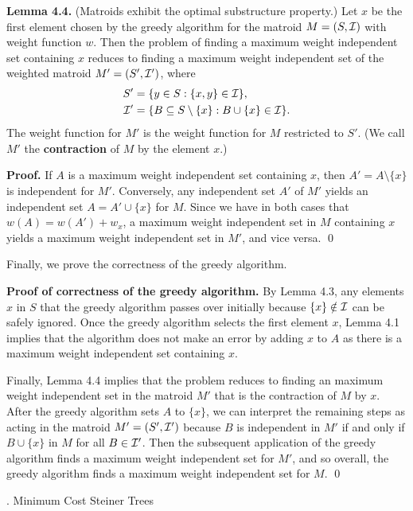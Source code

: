\documentclass{article}
\begin{document}
{\color{violet}
{\bf Lemma 4.4.} (Matroids exhibit the optimal substructure property.)
Let $x$ be the first element chosen by the greedy algorithm for the 
matroid $M = (S, {\cal I})$ with weight function $w$. Then the problem 
of finding a maximum weight independent set containing $x$ reduces to 
finding a maximum weight independent set of the weighted matroid 
$M' = (S', {\cal I}')$, where 
\begin{align*}
    S' &= \{y \in S : \{x, y\} \in {\cal I}\}, \\ 
    {\cal I}' &= \{B \subseteq S \setminus \{x\} : B \cup \{x\} \in {\cal I}\}.
\end{align*} 
The weight function for $M'$ is the weight function for $M$ restricted to $S'$. 
(We call $M'$ the {\bf contraction} of $M$ by the element $x$.)
}

{\color{blue}
{\bf Proof.} If $A$ is a maximum weight independent set containing $x$, 
then $A' = A \setminus \{x\}$ is independent for $M'$. Conversely, 
any independent set $A'$ of $M'$ yields an independent set 
$A = A' \cup \{x\}$ for $M$. Since we have in both cases that 
$w(A) = w(A') + w_x$, a maximum weight independent set in $M$ 
containing $x$ yields a maximum weight independent set in $M'$, and vice versa. \qed 
}

Finally, we prove the correctness of the greedy algorithm.

{\color{blue}
{\bf Proof of correctness of the greedy algorithm.} By Lemma 4.3, 
any elements $x$ in $S$ that the greedy algorithm passes over initially because 
$\{x\} \notin {\cal I}$ can be safely ignored. Once the greedy algorithm 
selects the first element $x$, Lemma 4.1 implies that the algorithm 
does not make an error by adding $x$ to $A$ as there is a maximum weight 
independent set containing $x$. 

\newpage
Finally, Lemma 4.4 implies that the problem reduces to finding an maximum weight independent set 
in the matroid $M'$ that is the contraction of $M$ by $x$. After the 
greedy algorithm sets $A$ to $\{x\}$, we can interpret the remaining steps 
as acting in the matroid $M' = (S', {\cal I}')$ because $B$ is independent in $M'$ 
if and only if $B \cup \{x\}$ in $M$ for all $B \in {\cal I}'$. Then the 
subsequent application of the greedy algorithm finds a maximum weight 
independent set for $M'$, and so overall, the greedy algorithm finds a 
maximum weight independent set for $M$. \qed 
} 

\newpage 
\begin{center}
    {. Minimum Cost Steiner Trees}
\end{center}
\end{document}
